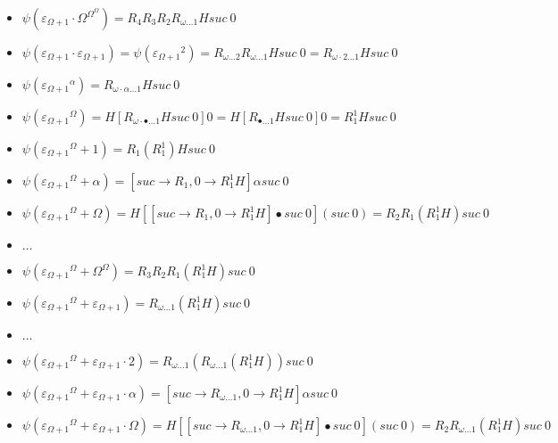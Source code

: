 \documentclass[10pt]{article}
\begin{document}
\begin{itemize}
\item \( \psi(\varepsilon_{\Omega+1} \cdot \Omega^{\Omega^\Omega}) = R_4 R_3 R_2 R_{\omega \ldots 1} H suc\ 0 \)

\item \( \psi(\varepsilon_{\Omega+1} \cdot \varepsilon_{\Omega+1}) = \psi({\varepsilon_{\Omega+1}}^2) = R_{\omega \ldots 2}  R_{\omega \ldots 1} H suc\ 0 = R_{\omega \cdot 2 \ldots 1} H suc\ 0 \)

\item \( \psi({\varepsilon_{\Omega+1}}^\alpha) = R_{\omega \cdot \alpha \ldots 1} H suc\ 0 \)

\item \( \psi({\varepsilon_{\Omega+1}}^\Omega) = H [R_{\omega \cdot \bullet \ldots 1} H suc\ 0] 0 = H [R_{\bullet \ldots 1} H suc\ 0] 0 = R^1_1 H suc\ 0 \)

\item \( \psi({\varepsilon_{\Omega+1}}^\Omega+1) = R_1 (R^1_1) H suc\ 0 \)

\item \( \psi({\varepsilon_{\Omega+1}}^\Omega+\alpha) = [suc \rightarrow R_1, 0 \rightarrow R^1_1 H] \alpha suc\ 0 \)

\item \( \psi({\varepsilon_{\Omega+1}}^\Omega+\Omega) = H [[suc \rightarrow R_1, 0 \rightarrow R^1_1 H] \bullet suc\ 0] (suc\ 0) = R_2 R_1 (R^1_1 H) suc\ 0 \)

\item \( \ldots \)

\item \( \psi({\varepsilon_{\Omega+1}}^\Omega+\Omega^\Omega) = R_3 R_2 R_1 (R^1_1 H) suc\ 0 \)

\item \( \psi({\varepsilon_{\Omega+1}}^\Omega+\varepsilon_{\Omega+1}) = R_{\omega \ldots 1} (R^1_1 H) suc\ 0 \)

\item \( \ldots \)

\item \( \psi({\varepsilon_{\Omega+1}}^\Omega+\varepsilon_{\Omega+1} \cdot 2) = R_{\omega \ldots 1} (R_{\omega \ldots 1} (R^1_1 H)) suc\ 0 \)

\item \( \psi({\varepsilon_{\Omega+1}}^\Omega+\varepsilon_{\Omega+1} \cdot \alpha) = [suc \rightarrow R_{\omega \ldots 1}, 0 \rightarrow R^1_1 H] \alpha suc\ 0 \)

\item \( \psi({\varepsilon_{\Omega+1}}^\Omega+\varepsilon_{\Omega+1} \cdot \Omega) = H [[suc \rightarrow R_{\omega \ldots 1}, 0 \rightarrow R^1_1 H] \bullet suc\ 0] (suc\ 0) = R_2 R_{\omega \ldots 1} (R^1_1 H) suc\ 0 \)


\end{itemize}
\end{document}
